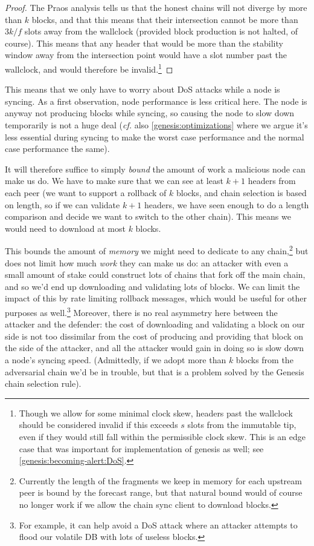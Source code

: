 \begin{proof}
The Praos analysis \cite{cryptoeprint:2017:573} tells us that the honest chains
will not diverge by more than $k$ blocks, and that this means that their
intersection cannot be more than $3k/f$ slots away from the wallclock (provided
block production is not halted, of course). This means that any header that
would be more than the stability window away from the intersection point
would have a slot number past the wallclock, and would therefore be
invalid.\footnote{Though we allow for some minimal clock skew, headers past
the wallclock should be considered invalid if this exceeds $s$ slots from the
immutable tip, even if they would still fall within the permissible clock
skew. This is an edge case that was important for implementation of genesis
as well; see \cref{genesis:becoming-alert:DoS}.}
\end{proof}

This means that we only have to worry about DoS attacks while a node is syncing.
As a first observation, node performance is less critical here. The node is
anyway not producing blocks while syncing, so causing the node to slow down
temporarily is not a huge deal (\emph{cf.} also \cref{genesis:optimizations}
where we argue it's less essential during syncing to make the worst case
performance and the normal case performance the same).

It will therefore suffice to simply \emph{bound} the amount of work a malicious
node can make us do. We have to make sure that we can see at least $k+1$ headers
from each peer (we want to support a rollback of $k$ blocks, and chain selection
is based on length, so if we can validate $k+1$ headers, we have seen enough to
do a length comparison and decide we want to switch to the other chain). This
means we would need to download at most $k$ blocks.

This bounds the amount of \emph{memory} we might need to dedicate to any
chain,\footnote{Currently the length of the fragments we keep in memory for each
upstream peer is bound by the forecast range, but that natural bound would of
course no longer work if we allow the chain sync client to download blocks.} but
does not limit how much \emph{work} they can make us do: an attacker with even a
small amount of stake could construct lots of chains that fork off the main
chain, and so we'd end up downloading and validating lots of blocks. We can
limit the impact of this by rate limiting rollback messages, which would be
useful for other purposes as well.\footnote{For example, it can help avoid a DoS
attack where an attacker attempts to flood our volatile DB with lots of useless
blocks.}  Moreover, there is no real asymmetry here between the attacker and the
defender: the cost of downloading and validating a block on our side is  not too
dissimilar from the cost of producing and providing that block on the side of
the attacker, and all the attacker would gain in doing so is slow down a node's
syncing speed. (Admittedly, if we adopt more than $k$ blocks from the
adversarial chain we'd be in trouble, but that is a problem solved by the
Genesis chain selection rule).

